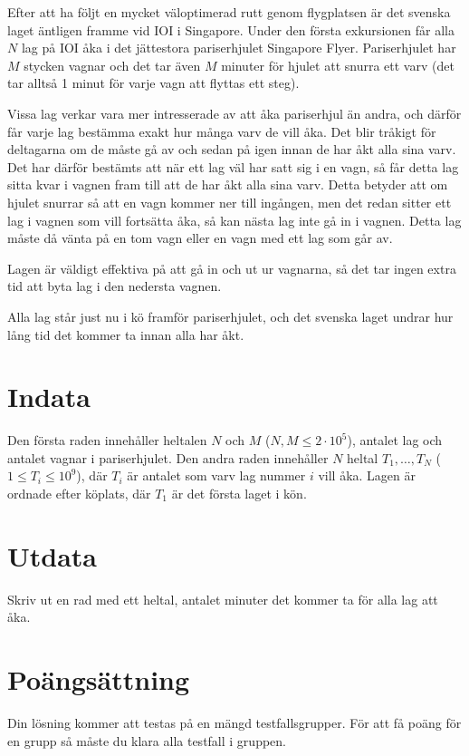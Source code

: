 %
%
Efter att ha följt en mycket väloptimerad rutt genom flygplatsen är det svenska laget äntligen framme vid IOI i Singapore.
Under den första exkursionen får alla $N$ lag på IOI åka i det jättestora pariserhjulet Singapore Flyer.
Pariserhjulet har $M$ stycken vagnar och det tar även $M$ minuter för hjulet att snurra ett varv
(det tar alltså 1 minut för varje vagn att flyttas ett steg).

Vissa lag verkar vara mer intresserade av att åka pariserhjul än andra, och därför får varje lag bestämma exakt hur många varv de vill åka.
Det blir tråkigt för deltagarna om de måste gå av och sedan på igen innan de har åkt alla sina varv.
Det har därför bestämts att när ett lag väl har satt sig i en vagn, så får detta lag sitta kvar i vagnen fram till att de har åkt alla sina varv.
Detta betyder att om hjulet snurrar så att en vagn kommer ner till ingången, men det redan sitter ett lag i vagnen som vill fortsätta åka,
så kan nästa lag inte gå in i vagnen. Detta lag måste då vänta på en tom vagn eller en vagn med ett lag som går av.

Lagen är väldigt effektiva på att gå in och ut ur vagnarna, så det tar ingen extra tid att byta lag i den nedersta vagnen.

Alla lag står just nu i kö framför pariserhjulet, och det svenska laget undrar hur lång tid det kommer ta innan alla har åkt.

\section*{Indata}
Den första raden innehåller heltalen $N$ och $M$ ($N,M \leq 2 \cdot 10^5$),
antalet lag och antalet vagnar i pariserhjulet.
Den andra raden innehåller $N$ heltal $T_1, \dots , T_N$ ($1 \leq T_i \leq 10^9$), där $T_i$ är antalet som varv lag
nummer $i$ vill åka. Lagen är ordnade efter köplats, där $T_1$ är det första laget i kön.

\section*{Utdata}
Skriv ut en rad med ett heltal, antalet minuter det kommer ta för alla lag att åka.

\section*{Poängsättning}
Din lösning kommer att testas på en mängd testfallsgrupper.
För att få poäng för en grupp så måste du klara alla testfall i gruppen.

